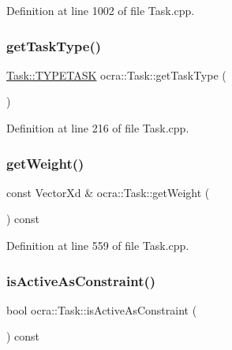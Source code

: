 Definition at line 1002 of file Task.\+cpp.

\hypertarget{classocra_1_1Task_a1fed0d65711edfdc4b9e83c292b147f8}{}\label{classocra_1_1Task_a1fed0d65711edfdc4b9e83c292b147f8} 
\subsubsection{\texorpdfstring{get\+Task\+Type()}{getTaskType()}}
{\footnotesize\ttfamily \hyperlink{classocra_1_1Task_ad9d224cf787aa61c098f282efb78254a}{Task\+::\+T\+Y\+P\+E\+T\+A\+SK} ocra\+::\+Task\+::get\+Task\+Type (\begin{DoxyParamCaption}{ }\end{DoxyParamCaption})}



Definition at line 216 of file Task.\+cpp.

\hypertarget{classocra_1_1Task_ae2b875972ff294578c1d65feddcf81ac}{}\label{classocra_1_1Task_ae2b875972ff294578c1d65feddcf81ac} 
\subsubsection{\texorpdfstring{get\+Weight()}{getWeight()}}
{\footnotesize\ttfamily const Vector\+Xd \& ocra\+::\+Task\+::get\+Weight (\begin{DoxyParamCaption}{ }\end{DoxyParamCaption}) const}



Definition at line 559 of file Task.\+cpp.

\hypertarget{classocra_1_1Task_afc9711292ed2b81d803003191f7ec6a1}{}\label{classocra_1_1Task_afc9711292ed2b81d803003191f7ec6a1} 
\subsubsection{\texorpdfstring{is\+Active\+As\+Constraint()}{isActiveAsConstraint()}}
{\footnotesize\ttfamily bool ocra\+::\+Task\+::is\+Active\+As\+Constraint (\begin{DoxyParamCaption}{ }\end{DoxyParamCaption}) const}



